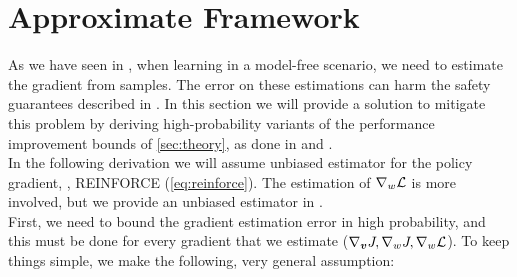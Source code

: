 \section{Approximate Framework}\label{sec:approx}

As we have seen in , when learning in a model-free scenario, we need to estimate the gradient from samples. The error on these estimations can harm the safety guarantees described in . In this section we will provide a solution to mitigate this problem by deriving high-probability variants of the performance improvement bounds of \ref{sec:theory}, as done in \cite{adaptive_step} and \cite{adaptive_batch}. \\
In the following derivation we will assume unbiased estimator for the policy gradient, \eg, REINFORCE (\ref{eq:reinforce}). The estimation of $\nabla_{w}\mathcal{L}$ is more involved, but we provide an unbiased estimator in .
%
%
%
%
\\
First, we need to bound the gradient estimation error in high probability, and this must be done for every gradient that we estimate (\eg $\nabla_{\boldsymbol{v}}J, \nabla_wJ, \nabla_w\mathcal{L}$). To keep things simple, we make the following, very general assumption:

